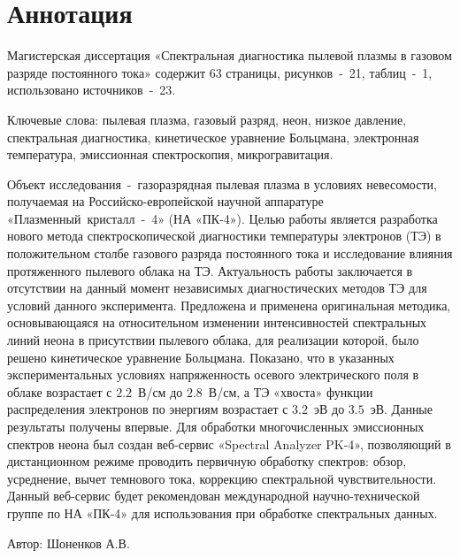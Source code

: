 \chapter*{\centering Аннотация}


Магистерская диссертация «Спектральная диагностика пылевой плазмы в газовом разряде постоянного тока»
содержит 63 страницы, рисунков~-~21, таблиц~-~1, использовано источников~-~23.

Ключевые слова: пылевая плазма, газовый разряд, неон, низкое давление, спектральная диагностика,
кинетическое уравнение Больцмана, электронная температура, эмиссионная спектроскопия, микрогравитация.

Объект исследования~-~газоразрядная пылевая плазма в условиях невесомости,
получаемая на Российско-европейской научной аппаратуре «Плазменный~кристалл~-~4» (НА «ПК-4»).
Целью работы является разработка нового метода спектроскопической диагностики температуры электронов (ТЭ) в
положительном столбе газового разряда постоянного тока и исследование влияния
протяженного пылевого облака на ТЭ. Актуальность работы
заключается в отсутствии на данный момент независимых диагностических методов
ТЭ для условий данного эксперимента.
Предложена и применена оригинальная методика, основывающаяся на
относительном изменении интенсивностей спектральных линий неона в
присутствии пылевого облака, для реализации которой, было решено
кинетическое уравнение Больцмана. Показано, что в указанных
экспериментальных условиях напряженность осевого электрического поля в облаке
возрастает с $2.2$~В/см до $2.8$~В/см, а ТЭ «хвоста» функции распределения
электронов по энергиям возрастает с $3.2$~эВ до $3.5$~эВ. Данные результаты
получены впервые. Для обработки многочисленных эмиссионных спектров неона
был создан веб-сервис «Spectral Analyzer PK-4», позволяющий в дистанционном
режиме проводить первичную обработку спектров: обзор, усреднение, вычет
темнового тока, коррекцию спектральной чувствительности. Данный
веб-сервис будет рекомендован международной научно-технической группе по НА
«ПК-4» для использования при обработке спектральных данных.

\vfill
\vfill
\begin{minipage}{.49\textwidth}\end{minipage}
\hfill
\begin{minipage}{.49\textwidth}
    Автор: \uline{\hfill} Шоненков А.В.
\end{minipage}
\vfill

\thispagestyle{empty}